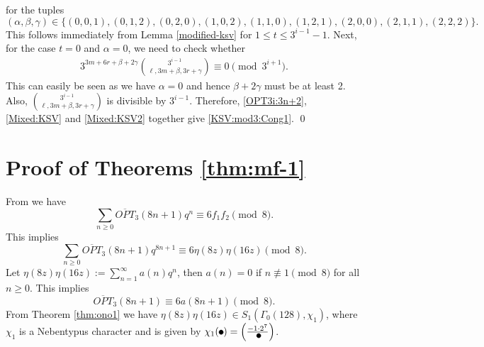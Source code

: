 \documentclass[12pt,reqno]{amsart}
\numberwithin{equation}{section}
\newcommand{\manjil}[1]{\textcolor{blue}{#1}}
\newcommand{\opt}{\overline{OPT}}
\begin{document}
for the tuples \[(\alpha,\beta,\gamma)\in \{(0,0,1),(0,1,2),(0,2,0),(1,0,2),(1,1,0),(1,2,1),(2,0,0),(2,1,1),(2,2,2)\}.\] This follows immediately from Lemma \ref{modified-ksv} for $1\leq t\leq 3^{i-1}-1$. Next, for the case $t=0$ and $\alpha=0$, we need to check whether
\begin{align}
     3^{3m+6r+\beta+2\gamma}\binom{3^{i-1}}{\ell,3m+\beta,3r+\gamma}\equiv0\pmod{3^{i+1}}. \label{Mixed:KSV2}
\end{align}
This can easily be seen as we have $\alpha=0$ and hence $\beta+2\gamma$ must be at least 2. Also, $\binom{3^{i-1}}{\ell,3m+\beta,3r+\gamma}$ is divisible by $3^{i-1}$. Therefore, \eqref{OPT3i:3n+2}, \eqref{Mixed:KSV} and \eqref{Mixed:KSV2} together give \eqref{KSV:mod3:Cong1}. \qed



\section{Proof of Theorems \ref{thm:mf-1}}\label{sec:mf}
    From \cite[Eq. (44)]{SSS} we have
    \[
    \sum_{n\geq 0}\opt_3(8n+1)q^n\equiv 6f_1f_2 \pmod 8.
    \]
    This implies
    \begin{equation}\label{eq:ass}
    \sum_{n\geq 0}\opt_3(8n+1)q^{8n+1}\equiv 6\eta(8z)\eta(16z) \pmod 8.
    \end{equation}
    Let $\eta(8z)\eta(16z):=\sum_{n=1}^\infty a(n)q^n$, then $a(n)=0$ if $n\not\equiv 1\pmod 8$ for all $n\geq 0$. This implies
    \begin{equation}
        \opt_3(8n+1)\equiv 6 a(8n+1) \pmod 8.
    \end{equation}
    From Theorem \ref{thm:ono1} we have $\eta(8z)\eta(16z)\in S_1(\Gamma_0(128), \chi_1)$, where $\chi_1$ is a Nebentypus character and is given by $\chi_1(\tikz\draw[black,fill=black] (0,0) circle (.5ex);)=\left(\frac{-1\cdot2^7}{\tikz\draw[black,fill=black] (0,0) circle (.5ex);}\right)$. 
    
\end{document}
